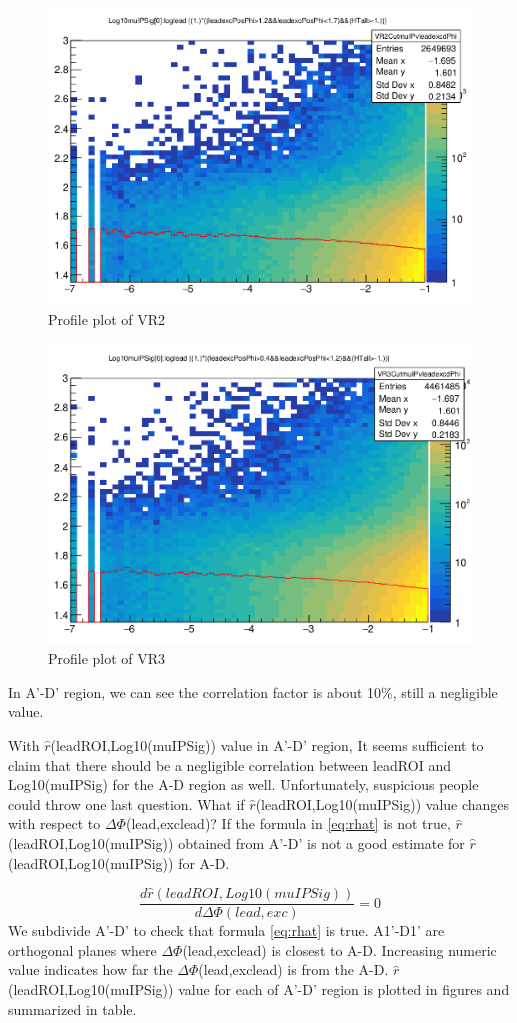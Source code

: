 \begin{figure}[h!]
  \caption{Profile plot of VR2}
  \label{fig:valcar2}
  \centering
  \includegraphics[width=0.65\linewidth]{figs/VR2.png}

\end{figure}

\begin{figure}[h!]
  \caption{Profile plot of VR3}
  \label{fig:valcar3}
  \centering
  \includegraphics[width=0.65\linewidth]{figs/VR3.png}

\end{figure}
In A'-D' region, we can see the correlation factor is about 10\%, still a negligible value.


With $\hat{r}$(leadROI,Log10(muIPSig)) value in A'-D' region, It seems sufficient to claim that there should be a negligible correlation between leadROI and Log10(muIPSig) for the A-D region as well.
Unfortunately, suspicious people could throw one last question.
What if $\hat{r}$(leadROI,Log10(muIPSig)) value changes with respect to $\Delta\Phi$(lead,exclead)?
If the formula in \ref{eq:rhat} is not true, $\hat{r}$(leadROI,Log10(muIPSig)) obtained from A'-D' is not a good estimate for $\hat{r}$(leadROI,Log10(muIPSig)) for A-D.


\begin{equation}
\label{eq:rhat}
	\frac{d\hat{r}(leadROI,Log10(muIPSig))}{d\Delta\Phi(lead,exc)}=0
\end{equation}
We subdivide A'-D' to check that formula \ref{eq:rhat} is true.
A1'-D1' are orthogonal planes where $\Delta\Phi$(lead,exclead) is closest to A-D. 
Increasing numeric value indicates how far the $\Delta\Phi$(lead,exclead) is from the A-D. 
$\hat{r}$(leadROI,Log10(muIPSig)) value for each of A'-D' region is plotted in figures and summarized in table.



